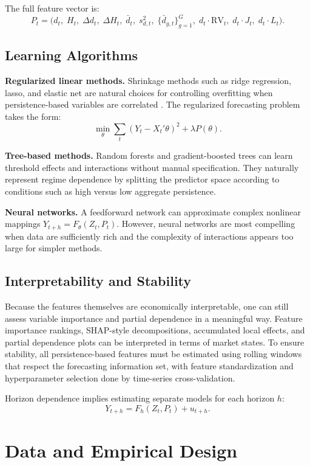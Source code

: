 \documentclass[12pt]{article}
\begin{document}
The full feature vector is:
\[
P_t = \bigl(d_t,\; H_t,\; \Delta d_t,\; \Delta H_t,\; \bar{d}_t,\; s_{d,t}^2,\; \{\bar{d}_{g,t}\}_{g=1}^{G},\; d_t \cdot \mathrm{RV}_t,\; d_t \cdot J_t,\; d_t \cdot L_t\bigr).
\]

\subsection{Learning Algorithms}

\textbf{Regularized linear methods.} Shrinkage methods such as ridge regression, lasso, and elastic net are natural choices for controlling overfitting when persistence-based variables are correlated \citep{Hastie2009}. The regularized forecasting problem takes the form:
\[
\min_{\theta} \sum_t (Y_t - X_t' \theta)^2 + \lambda P(\theta).
\]

\textbf{Tree-based methods.} Random forests \citep{Breiman2001} and gradient-boosted trees \citep{Friedman2001} can learn threshold effects and interactions without manual specification. They naturally represent regime dependence by splitting the predictor space according to conditions such as high versus low aggregate persistence.

\textbf{Neural networks.} A feedforward network can approximate complex nonlinear mappings $Y_{t+h} = F_\theta(Z_t, P_t)$. However, neural networks are most compelling when data are sufficiently rich and the complexity of interactions appears too large for simpler methods.

\subsection{Interpretability and Stability}

Because the features themselves are economically interpretable, one can still assess variable importance and partial dependence in a meaningful way. Feature importance rankings, SHAP-style decompositions, accumulated local effects, and partial dependence plots can be interpreted in terms of market states. To ensure stability, all persistence-based features must be estimated using rolling windows that respect the forecasting information set, with feature standardization and hyperparameter selection done by time-series cross-validation.

Horizon dependence implies estimating separate models for each horizon $h$:
\[
Y_{t+h} = F_h(Z_t, P_t) + u_{t+h}.
\]

\section{Data and Empirical Design}
\label{sec:data}
\end{document}
